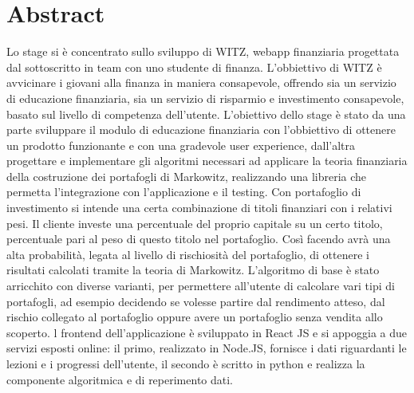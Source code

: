\chapter*{Abstract}

Lo stage si è concentrato sullo sviluppo di WITZ, webapp finanziaria progettata dal sottoscritto in team con uno studente di finanza.
L'obbiettivo di WITZ è avvicinare i giovani alla finanza in maniera consapevole, offrendo sia un servizio di educazione finanziaria, sia un servizio di risparmio e investimento consapevole, basato sul livello di competenza dell'utente. 
L'obiettivo dello stage è stato da una parte sviluppare  il modulo di educazione finanziaria con l'obbiettivo di ottenere un prodotto funzionante e con una gradevole user experience, dall'altra progettare e implementare gli algoritmi necessari ad applicare la teoria finanziaria della costruzione dei portafogli di Markowitz, realizzando  una libreria che permetta l'integrazione con l'applicazione e il testing.
Con portafoglio di investimento si intende una certa combinazione di titoli finanziari con i relativi pesi. Il cliente investe una percentuale del proprio capitale su un certo titolo, percentuale pari al peso di questo titolo nel portafoglio. Così facendo avrà una alta probabilità, legata al livello di rischiosità del portafoglio, di ottenere i risultati calcolati tramite la teoria di Markowitz. 
L'algoritmo di base è stato arricchito con diverse varianti, per permettere all'utente di calcolare vari tipi di portafogli, ad esempio decidendo se volesse partire dal rendimento atteso, dal rischio collegato al portafoglio oppure avere un portafoglio senza vendita allo scoperto.
l frontend dell'applicazione è sviluppato in React JS e si appoggia a due servizi esposti online: il primo, realizzato in Node.JS, fornisce i dati riguardanti le lezioni e i progressi dell'utente, il secondo è scritto in python e realizza la componente algoritmica e di reperimento dati. 